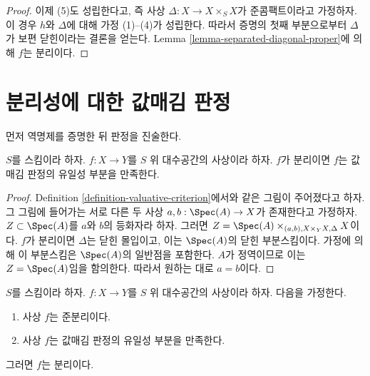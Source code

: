 \begin{proof}
\medskip\noindent
이제 (5)도 성립한다고, 즉 사상
$\Delta : X \to X \times_S X$가 준콤팩트이라고 가정하자. 이 경우
$h$와 $\Delta$에 대해 가정 (1)--(4)가 성립한다. 따라서 증명의 첫째
부분으로부터 $\Delta$가 보편 닫힌이라는 결론을 얻는다. Lemma
\ref{lemma-separated-diagonal-proper}에 의해 $f$는 분리이다.
\end{proof}

\section{분리성에 대한 값매김 판정}
\label{section-valuative-separatedness}

\noindent
먼저 역명제를 증명한 뒤 판정을 진술한다.

\begin{lemma}
\label{lemma-separated-implies-valuative}
$S$를 스킴이라 하자.
$f : X \to Y$를 $S$ 위 대수공간의 사상이라 하자.
$f$가 분리이면 $f$는 값매김 판정의 유일성 부분을 만족한다.
\end{lemma}

\begin{proof}
Definition \ref{definition-valuative-criterion}에서와 같은 그림이
주어졌다고 하자. 그 그림에 들어가는 서로 다른 두 사상
$a, b : \Spec(A) \to X$가 존재한다고 가정하자.
$Z \subset \Spec(A)$를 $a$와 $b$의 등화자라 하자. 그러면
$Z = \Spec(A) \times_{(a, b), X \times_Y X, \Delta} X$이다.
$f$가 분리이면 $\Delta$는 닫힌 몰입이고, 이는 $\Spec(A)$의 닫힌
부분스킴이다. 가정에 의해 이 부분스킴은 $\Spec(A)$의 일반점을 포함한다.
$A$가 정역이므로 이는 $Z = \Spec(A)$임을 함의한다. 따라서 원하는 대로
$a = b$이다.
\end{proof}

\begin{lemma}
\label{lemma-valuative-criterion-separatedness}
$S$를 스킴이라 하자.
$f : X \to Y$를 $S$ 위 대수공간의 사상이라 하자. 다음을 가정한다.
\begin{enumerate}
\item 사상 $f$는 준분리이다.
\item 사상 $f$는 값매김 판정의 유일성 부분을 만족한다.
\end{enumerate}
그러면 $f$는 분리이다.
\end{lemma}

